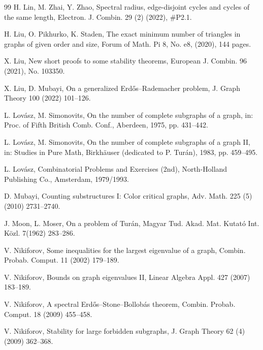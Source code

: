 \documentclass[11pt]{article}
\begin{document}
\begin{thebibliography}{99}
H. Lin, M. Zhai, Y. Zhao, Spectral radius, edge-disjoint cycles and 
cycles of the same length, 
Electron. J. Combin. 29 (2) (2022), \#P2.1. 

H. Liu, O. Pikhurko, K. Staden, 
The exact minimum number of triangles in graphs of given order and size, 
Forum of Math. Pi 8, No. e8, (2020), 144 pages. 


X. Liu, 
New short proofs to some stability theorems, 
European J. Combin.  96 (2021), No. 103350. 

X. Liu, D. Mubayi, 
On a generalized Erd\H{o}s--Rademacher problem, 
J. Graph Theory 100 (2022) 101--126. 



L. Lov\'{a}sz, M. Simonovits,
On the number of complete subgraphs of a graph,
in: Proc. of Fifth British Comb. Conf., Aberdeen, 1975,
pp. 431--442.

L. Lov\'{a}sz, M. Simonovits,
On the number of complete subgraphs of a graph II,
in: Studies in Pure Math, Birkh\"{a}user (dedicated to P. Tur\'{a}n), 1983,
pp. 459--495. 

L. Lov\'{a}sz, 
Combinatorial Problems and Exercises (2nd), 
North-Holland Publishing Co., Amsterdam, 1979/1993. 


 D. Mubayi, 
 Counting substructures I: Color critical graphs, 
 Adv. Math. 225 (5) (2010) 2731--2740.
 
 
J. Moon, L. Moser, On a problem of Tur\'{a}n, 
Magyar Tud. Akad. Mat. Kutat\'{o} Int. K\"{o}zl. 7(1962) 283--286. 


V. Nikiforov, 
Some inequalities for the largest eigenvalue of a graph, 
Combin. Probab. Comput. 11 (2002) 179--189. 

V. Nikiforov, 
Bounds on graph eigenvalues II, 
Linear Algebra Appl. 427 (2007) 183--189. 


V. Nikiforov, 
A spectral Erd\H{o}s--Stone--Bollob\'{a}s theorem, 
Combin. Probab.  Comput. 18 (2009) 455--458.  

V. Nikiforov, 
Stability for large forbidden subgraphs,  
J. Graph Theory 62 (4) (2009) 362--368.  


\end{thebibliography}
\end{document}
